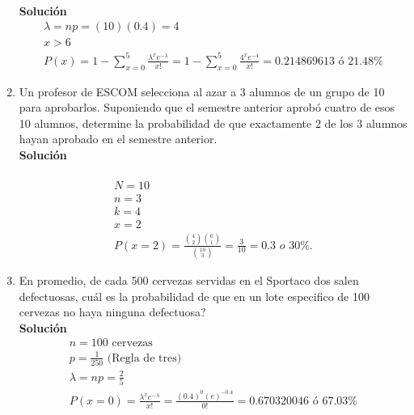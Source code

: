\begin{enumerate}
    \\\textbf{Solución}
    \\
    \begin{gather*}
    \lambda=np=(10)(0.4) = 4\\
    x>6\\
    P(x) =1-\sum _{x=0}^{5}\frac{{\lambda}^{x}{e}^{-\lambda}}{x!}=1 - \sum _{x=0}^{5}\frac{{4}^{x}{e}^{-4}}{x!} =  0.214869613 \text{ ó } 21.48\%
    \end{gather*}
    \item Un profesor de ESCOM selecciona al azar a 3 alumnos de un grupo de 10 para aprobarlos. Suponiendo que el semestre anterior aprobó cuatro de esos 10 alumnos, determine la probabilidad de que exactamente 2 de los 3 alumnos hayan aprobado en el semestre anterior.
    \\\textbf{Solución}
    \\ \\
    \begin{gather*}
    N = 10 \\
    n = 3 \\
    k = 4 \\
    x = 2 \\
    P(x = 2) = \frac{ \binom{4}{2} \binom{6}{1}}{\binom{10}{3}} = \frac{3}{10} = 0.3 \textit{ o 30\%.}
    \end{gather*}
    \item En promedio, de cada 500 cervezas servidas en el Sportaco dos salen defectuosas, cuál es la probabilidad de que en un lote especifico de 100 cervezas no haya ninguna defectuosa?
    \\\textbf{Solución}
    \begin{gather*}
    n = 100 \text{ cervezas}\\
    p = \frac{1}{250} \text{ (Regla de tres)}\\
    \lambda = np = \frac{2}{5}\\
    P(x=0) = \frac{{\lambda}^{x}{e}^{-\lambda}}{x!}=\frac{(0.4)^{0}(e)^{-0.4}}{0!}= 0.670320046 \text{ ó } 67.03\%\\
    \end{gather*}
    

\end{enumerate}
